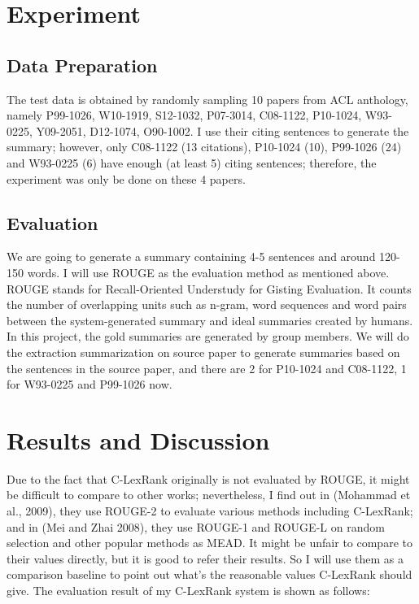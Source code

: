 \documentclass[hyp]{socreport}
\begin{document}
\section{Experiment}

\subsection{Data Preparation}
  The test data is obtained by randomly sampling 10 papers from ACL
  anthology, namely P99-1026, W10-1919, S12-1032, P07-3014, C08-1122,
P10-1024, W93-0225, Y09-2051, D12-1074, O90-1002. I use their citing
sentences to generate the summary; however, only 
C08-1122 (13 citations), P10-1024 (10), P99-1026 (24) and W93-0225 (6)
have enough (at least 5) citing sentences; therefore, the experiment
was only be done on these 4 papers.

\subsection{Evaluation}
  We are going to generate a summary containing 4-5 sentences and
  around 120-150 words. 
I will use ROUGE as the evaluation method as mentioned above. ROUGE
stands for Recall-Oriented Understudy for Gisting Evaluation.
It counts the number of overlapping units such 
as n-gram, word sequences and word pairs between the system-generated
summary and ideal summaries created by humans.
In this project, 
the gold summaries are generated by group members. We will do the
extraction summarization on source paper to generate summaries 
based on the sentences in the source paper, and there are 2 for
P10-1024 and C08-1122, 1 for W93-0225 and P99-1026 now.

\section{Results and Discussion}

  Due to the fact that C-LexRank originally is not evaluated by ROUGE,
  it might be difficult to compare to other works; 
nevertheless, I find out in (Mohammad et al., 2009), they use ROUGE-2
to evaluate various methods including C-LexRank; 
and in (Mei and Zhai 2008), they use ROUGE-1 and ROUGE-L on random
selection and other popular methods as MEAD. It might 
be unfair to compare to their values directly, but it is good to refer
their results. So I will use them as a comparison 
baseline to point out what's the reasonable values C-LexRank should
give. The evaluation result of my C-LexRank system is 
shown as follows:
\end{document}
